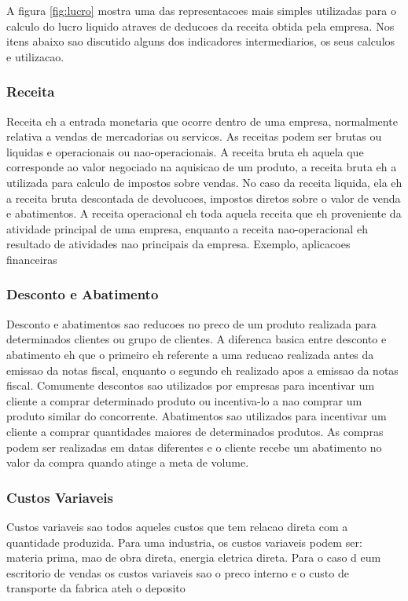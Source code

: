 \documentclass[12pt]{article}
\begin{document}
A figura \ref{fig:lucro} mostra uma das representacoes mais simples utilizadas para o calculo do lucro liquido atraves de deducoes da receita obtida pela empresa. Nos itens abaixo sao discutido alguns dos indicadores intermediarios, os seus calculos e utilizacao. 

\subsubsection{Receita}
Receita eh a entrada monetaria que ocorre dentro de uma empresa, normalmente relativa a vendas de mercadorias ou servicos. As receitas podem ser brutas ou liquidas e operacionais ou nao-operacionais. A receita bruta eh aquela que corresponde ao valor negociado na aquisicao de um produto, a receita bruta eh a utilizada para calculo de impostos sobre vendas. No caso da receita liquida, ela eh a receita bruta descontada de devolucoes, impostos diretos sobre o valor de venda e abatimentos.
A receita operacional eh toda aquela receita que eh proveniente da atividade principal de uma empresa, enquanto a receita nao-operacional eh resultado de atividades nao principais da empresa. Exemplo, aplicacoes financeiras

\subsubsection{Desconto e Abatimento}
Desconto e abatimentos sao reducoes no preco de um produto realizada para determinados clientes ou grupo de clientes. A diferenca basica entre desconto e abatimento eh que o primeiro eh referente a uma reducao realizada antes da emissao da notas fiscal, enquanto o segundo eh realizado apos a emissao da notas fiscal. Comumente descontos sao utilizados por empresas para incentivar um cliente a comprar determinado produto ou incentiva-lo a nao comprar um produto similar do concorrente. Abatimentos sao utilizados para incentivar um cliente a comprar quantidades maiores de determinados produtos. As compras podem ser realizadas em datas diferentes e o cliente recebe um abatimento no valor da compra quando atinge a meta de volume.

\subsubsection{Custos Variaveis}
Custos variaveis sao todos aqueles custos que tem relacao direta com a quantidade produzida. Para uma industria, os custos variaveis podem ser: materia prima, mao de obra direta, energia eletrica direta. Para o caso d eum escritorio de vendas os custos variaveis sao o preco interno e o custo de transporte da fabrica ateh o deposito
\end{document}
